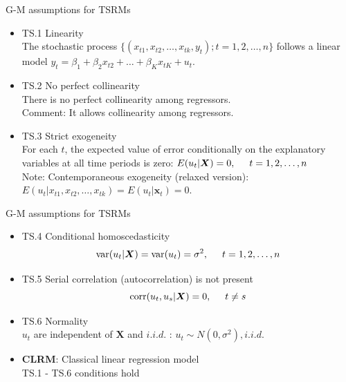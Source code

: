 \documentclass{beamer}
\begin{document}
\begin{frame}{G-M assumptions for TSRMs}
\begin{itemize}
\item TS.1 Linearity \\ 
The stochastic process $\{(x_{t1},x_{t2},\dots,x_{tk},y_t);t=1,2,\dots, n \}$ 
follows a linear model $ y_t = \beta_1 + \beta_2 x_{t2} + \dots + \beta_K x_{tK}+u_t$.
\medskip
\item TS.2 No perfect collinearity \\
There is no perfect collinearity among regressors. \\
{\footnotesize Comment: It allows collinearity among regressors.}
\medskip
\item TS.3 Strict exogeneity \\ 
For each $t$, the expected value of error conditionally on the explanatory variables at all time periods is zero: $ E(u_t|\boldsymbol{X})=0, \hspace{0.5cm} t = 1,2,\dots,n$ \\ \medskip
    {\footnotesize Note: Contemporaneous exogeneity (relaxed version): $E(u_t|x_{t1},x_{t2},\dots,x_{tk})=E(u_t|\boldsymbol{x}_t)=0$.}  
\end{itemize}
\end{frame}
\begin{frame}{G-M assumptions for TSRMs}
\begin{itemize}
 \item TS.4 Conditional homoscedasticity 
 $$\textnormal{var}(u_t|\boldsymbol{X})=\textnormal{var}(u_t)=\sigma^2, \hspace{0.5cm} t=1,2,\dots,n$$
 \medskip
 \item TS.5 Serial correlation (autocorrelation) is not present $$ \textnormal{corr}(u_t,u_s|\boldsymbol{X}) = 0, \hspace{0.5cm} t\neq s$$
 \medskip
 \item TS.6 Normality \\
 $u_t$ are independent of $\boldsymbol{X}$ and $\textit{i.i.d.}$ :  $u_t \sim N(0,\sigma^2), \textit{i.i.d.} $
  \vspace{0.6cm}
  \item \textbf{CLRM}: Classical linear regression model \\
 TS.1 - TS.6 conditions hold
\end{itemize}
\end{frame}
\end{document}
